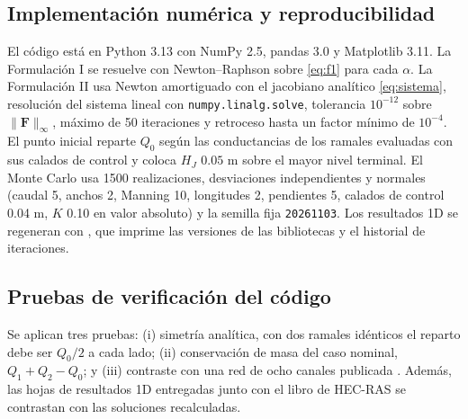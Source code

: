 \subsection{Implementación numérica y reproducibilidad}
El código está en Python 3.13 con NumPy 2.5, pandas 3.0 y Matplotlib 3.11. La Formulación I se resuelve con Newton--Raphson sobre \eqref{eq:f1} para cada $\alpha$. La Formulación II usa Newton amortiguado con el jacobiano analítico \eqref{eq:sistema}, resolución del sistema lineal con \texttt{numpy.linalg.solve}, tolerancia $10^{-12}$ sobre $\|\mathbf F\|_\infty$, máximo de 50 iteraciones y retroceso hasta un factor mínimo de $10^{-4}$. El punto inicial reparte $Q_0$ según las conductancias de los ramales evaluadas con sus calados de control y coloca $H_J$ $0.05$ m sobre el mayor nivel terminal. El Monte Carlo usa 1500 realizaciones, desviaciones independientes y normales (caudal 5\pc, anchos 2\pc, Manning 10\pc, longitudes 2\pc, pendientes 5\pc, calados de control 0.04 m, $K$ 0.10 en valor absoluto) y la semilla fija \texttt{20261103}. Los resultados 1D se regeneran con , que imprime las versiones de las bibliotecas y el historial de iteraciones.

\subsection{Pruebas de verificación del código}
Se aplican tres pruebas: (i) simetría analítica, con dos ramales idénticos el reparto debe ser $Q_0/2$ a cada lado; (ii) conservación de masa del caso nominal, $Q_1+Q_2-Q_0$; y (iii) contraste con una red de ocho canales publicada \citep[cap.~6]{chaudhry2008}. Además, las hojas de resultados 1D entregadas junto con el libro de HEC-RAS se contrastan con las soluciones recalculadas.


